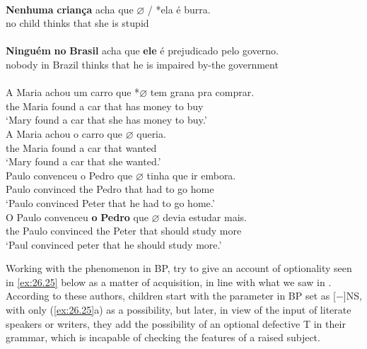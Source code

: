 \documentclass[output=paper]{langsci/langscibook}
\begin{document}
\ea\label{ex:26.22}
    \ea \textcite{NegraoMuller1996}\\
    \gll    \textbf{Nenhuma} \textbf{criança} acha que \textbf{$\varnothing$} / *ela é burra.\\
            no child     thinks that {} {} \hphantom{(}she is stupid\\
    \ex \textcite{BarbosaDuarteKato2005}\\
    \gll    \textbf{Ninguém} \textbf{no} \textbf{Brasil} acha    que \textbf{ele}\textbf{} é prejudicado pelo governo.\\
            nobody    in Brazil   thinks  that he is  impaired     by-the government\\
    \z
\ex%
    \label{ex:26.23}
    \ea     \textcite{FigueiredoSilva2000}\\
	\gll	A Maria achou um carro que *\textbf{$\varnothing$} tem grana pra comprar. \\
			the Maria  found   a   car     that  {} has money  to buy\\
	\glt	\enquote*{Mary found  a car that she has money to buy.}
    \ex     \textcite{Kato2009}\\
	\gll	A Maria achou o carro que \textbf{$\varnothing$} queria.\\
			the Maria    found  a car     that {} wanted\\
	\glt	\enquote*{Mary found a car that she wanted.}
    \z
\ex%
    \label{ex:26.24}
    \ea     \textcite{Modesto2000}\\
	\gll	Paulo convenceu o Pedro que  \textbf{$\varnothing$} tinha que ir embora.\\
            Paulo  convinced the Pedro that {} had to go home\\
	\glt	\enquote*{Paulo convinced Peter that he had to go home.}
    \ex     \textcite{Kato2009}\\
    \gll	O Paulo convenceu \textbf{o} \textbf{Pedro}\textbf{} que \textbf{$\varnothing$}\textbf{} devia estudar mais.\\
			the Paulo convinced the Peter that {} should study more\\
	\glt	\enquote*{Paul convinced peter that he should study more.}
    \z
\z

Working with the  phenomenon in \gls{BP},
\citet{MartinsNunes2009} try to give an account of optionality seen in
\eqref{ex:26.25} below as a matter of acquisition, in
line with what we saw in .  According to these authors,
children start with the parameter in \gls{BP} set as
[$-$]NS, with only (\ref{ex:26.25}a) as a possibility, but later, in view of
the input of literate speakers or writers, they add the possibility of an
optional defective T in their grammar, which is incapable of  checking  the
features of a raised subject.
\end{document}
